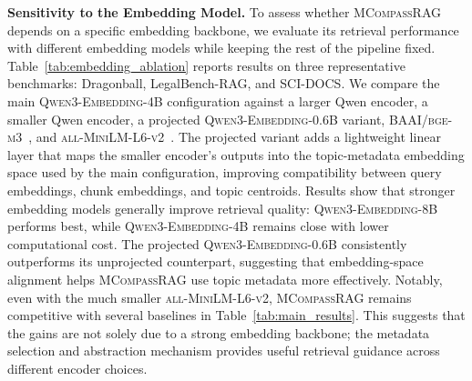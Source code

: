 \documentclass{llmxive}
\providecommand{\name}[1]{\textsc{MCompassRAG}\xspace}
\begin{document}
\noindent
\textbf{Sensitivity to the Embedding Model. }
To assess whether \name{} depends on a specific embedding backbone, we evaluate its retrieval performance with different embedding models while keeping the rest of the pipeline fixed. Table~\ref{tab:embedding_ablation} reports results on three representative benchmarks: Dragonball, LegalBench-RAG, and SCI-DOCS. We compare the main \textsc{Qwen3-Embedding-4B} configuration against a larger Qwen encoder, a smaller Qwen encoder, a projected \textsc{Qwen3-Embedding-0.6B} variant, \textsc{BAAI/bge-m3}~\cite{chen-etal-2024-m3}, and \textsc{all-MiniLM-L6-v2}~\cite{reimers2019sentencebertsentenceembeddingsusing, wang2020minilmdeepselfattentiondistillation}. The projected variant adds a lightweight linear layer that maps the smaller encoder's outputs into the topic-metadata embedding space used by the main configuration, improving compatibility between query embeddings, chunk embeddings, and topic centroids. Results show that stronger embedding models generally improve retrieval quality: \textsc{Qwen3-Embedding-8B} performs best, while \textsc{Qwen3-Embedding-4B} remains close with lower computational cost. The projected \textsc{Qwen3-Embedding-0.6B} consistently outperforms its unprojected counterpart, suggesting that embedding-space alignment helps \name{} use topic metadata more effectively. Notably, even with the much smaller \textsc{all-MiniLM-L6-v2}, \name{} remains competitive with several baselines in Table~\ref{tab:main_results}. This suggests that the gains are not solely due to a strong embedding backbone; the metadata selection and abstraction mechanism provides useful retrieval guidance across different encoder choices.
\end{document}
